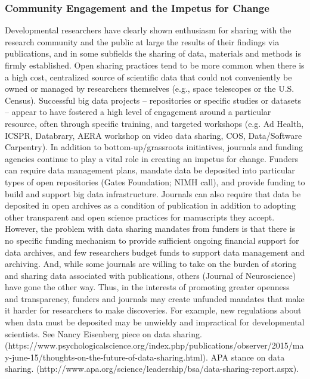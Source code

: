 \documentclass[letterpaper,man,apacite]{apa6}
\begin{document}
\subsubsection{Community Engagement and the Impetus for Change}

Developmental researchers have clearly shown enthusiasm for sharing with the research community and the public at large the results of their findings via publications, and in some subfields the sharing of data, materials and methods is firmly established.
Open sharing practices tend to be more common when there is a high cost, centralized source of scientific data that could not conveniently be owned or managed by researchers themselves (e.g., space telescopes or the U.S. Census).
Successful big data projects -- repositories or specific studies or datasets -- appear to have fostered a high level of engagement around a particular resource, often through specific training, and targeted workshops (e.g. Ad Health, ICSPR, Databrary, AERA workshop on video data sharing, COS, Data/Software Carpentry).
In addition to bottom-up/grassroots initiatives, journals and funding agencies continue to play a vital role in creating an impetus for change.
Funders can require data management plans, mandate data be deposited into particular types of open repositories (Gates Foundation; NIMH call), and provide funding to build and support big data infrastructure.
Journals can also require that data be deposited in open archives as a condition of publication in addition to adopting other transparent and open science practices for manuscripts they accept.
However, the problem with data sharing mandates from funders is that there is no specific funding mechanism to provide sufficient ongoing financial support for data archives, and few researchers budget funds to support data management and archiving.
And, while some journals are willing to take on the burden of storing and sharing data associated with publications, others (Journal of Neuroscience) have gone the other way.
Thus, in the interests of promoting greater openness and transparency, funders and journals may create unfunded mandates that make it harder for researchers to make discoveries.
For example, new regulations about when data must be deposited may be unwieldy and impractical for developmental scientists. 
See Nancy Eisenberg piece on data sharing. (https://www.psychologicalscience.org/index.php/publications/observer/2015/may-june-15/thoughts-on-the-future-of-data-sharing.html).
APA stance on data sharing. (http://www.apa.org/science/leadership/bsa/data-sharing-report.aspx).
\end{document}
